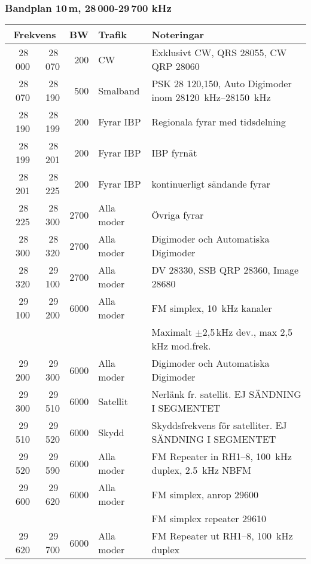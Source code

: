 \subsubsection{Bandplan 10\,m, 28\,000-29\,700 kHz}
\begin{tabular}{rrrll}
\multicolumn{2}{c}{\textbf{Frekvens}} & \textbf{BW} & \textbf{Trafik} & \textbf{Noteringar} \\ \hline

28\,000 & 28\,070 & 200  & CW         & Exklusivt CW, QRS \SI{28055}{}, CW QRP \SI{28060}{}              \\ \hline
28\,070 & 28\,190 & 500  & Smalband   & PSK 28 120,150, Auto Digimoder inom \SIrange{28120}{28150}{kHz}       \\ \hline
28\,190 & 28\,199 & 200  & Fyrar IBP  & Regionala fyrar med tidsdelning                        \\ \hline
28\,199 & 28\,201 & 200  & Fyrar IBP  & IBP fyrnät                                             \\ \hline
28\,201 & 28\,225 & 200  & Fyrar IBP  & kontinuerligt sändande fyrar                           \\ \hline
28\,225 & 28\,300 & 2700 & Alla moder & Övriga fyrar                                           \\ \hline
28\,300 & 28\,320 & 2700 & Alla moder & Digimoder och Automatiska Digimoder                    \\ \hline
28\,320 & 29\,100 & 2700 & Alla moder & DV \SI{28330}{}, SSB QRP \SI{28360}{}, Image \SI{28680}{}                    \\
29\,100 & 29\,200 & 6000 & Alla moder & FM simplex, \SI{10}{kHz} kanaler                            \\
        &         &      &            & Maximalt $\pm$2,5\,kHz dev., max 2,5\,kHz mod.frek.     \\ \hline
29\,200 & 29\,300 & 6000 & Alla moder & Digimoder och Automatiska Digimoder                    \\ \hline
29\,300 & 29\,510 & 6000 & Satellit   & Nerlänk fr. satellit. EJ SÄNDNING I SEGMENTET          \\ \hline
29\,510 & 29\,520 & 6000 & Skydd      & Skyddsfrekvens för satelliter. EJ SÄNDNING I SEGMENTET \\ \hline
29\,520 & 29\,590 & 6000 & Alla moder & FM Repeater in RH1--8, \SI{100}{kHz} duplex, \SI{2.5}{kHz} NBFM  \\ \hline
29\,600 & 29\,620 & 6000 & Alla moder & FM simplex, anrop \SI{29600}{}                              \\
        &         &      &            & FM simplex repeater \SI{29610}{}                            \\ \hline
29\,620 & 29\,700 & 6000 & Alla moder & FM Repeater ut RH1--8, \SI{100}{kHz} duplex                 \\ \hline
\end{tabular}
\newpage

